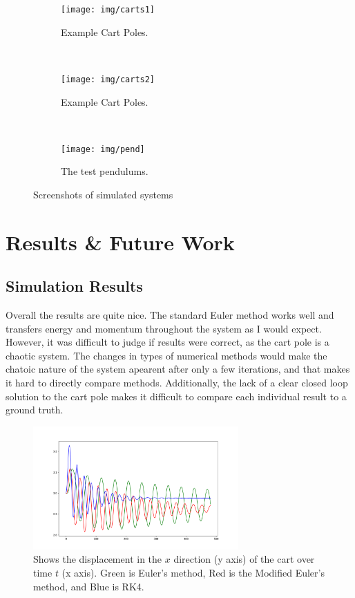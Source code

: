 \documentclass[12pt]{article}
\begin{document}
\begin{figure}[!ht]
    \centering
    \begin{subfigure}[b]{0.3\textwidth}
        \texttt{[image: img/carts1]}
        \caption{Example Cart Poles.}
        \label{fig:gull}
    \end{subfigure}
    ~ %
    \begin{subfigure}[b]{0.3\textwidth}
        \texttt{[image: img/carts2]}
        \caption{Example Cart Poles.}
        \label{fig:tiger}
    \end{subfigure}
    ~ %
    \begin{subfigure}[b]{0.3\textwidth}
        \texttt{[image: img/pend]}
        \caption{The test pendulums.}
        \label{fig:mouse}
    \end{subfigure}
    \caption{Screenshots of simulated systems}\label{fig:animals}
\end{figure}


\section{Results \& Future Work}

\subsection{Simulation Results}

Overall the results are quite nice. The standard Euler method works well and transfers
energy and momentum throughout the system as I would expect. However, it was difficult to
judge if results were correct, as the cart pole is a chaotic system. The changes in types
of numerical methods would make the chatoic nature of the system apearent after only a
few iterations, and that makes it hard to directly compare methods. Additionally,
the lack of a clear closed loop solution to the cart pole makes it difficult to compare
each individual result to a ground truth.

\begin{figure}[!ht]
 \centering
 \includegraphics[width=0.7\textwidth]{../data/Figure_1}
 \caption{Shows the displacement in the $x$ direction (y axis) of the cart
 over time $t$ (x axis). Green is Euler's method, Red is the Modified Euler's method, and Blue is RK4.}
 \label{fig:yeet}
\end{figure}
\end{document}
